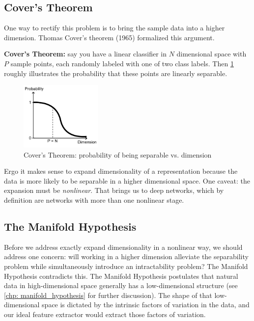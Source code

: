 \subsection{Cover's Theorem}

One way to rectify this problem is to bring the sample data into a higher dimension.
Thomas Cover's theorem (1965) formalized this argument.

\textbf{Cover's Theorem:} say you have a linear classifier in $N$ dimensional space with $P$ sample points, each randomly labeled with one of two class labels.
Then \cref{fig:covers_theorem} roughly illustrates the probability that these points are linearly separable.

\begin{figure}[ht]
\centering
\includegraphics[width=40mm]{lectures/01-b/covers_theorem.png}
\caption{Cover's Theorem: probability of being separable vs. dimension}
\label{fig:covers_theorem}
\end{figure}

Ergo it makes sense to expand dimensionality of a representation because the data is more likely to be separable in a higher dimensional space.
One caveat: the expansion must be \emph{nonlinear}.
That brings us to deep networks, which by definition are networks with more than one nonlinear stage.

\subsection{The Manifold Hypothesis}

Before we address exactly expand dimensionality in a nonlinear way, we should address one concern: will working in a higher dimension alleviate the separability problem while simultaneously introduce an intractability problem?
The Manifold Hypothesis contradicts this.
The Manifold Hypothesis postulates that natural data in high-dimensional space generally has a low-dimensional structure (see \cref{chp: manifold_hypothesis} for further discussion).
The shape of that low-dimensional space is dictated by the intrinsic factors of variation in the data, and our ideal feature extractor would extract those factors of variation.

